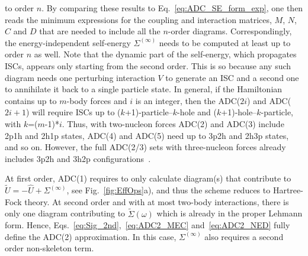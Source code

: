 to order $n$. By comparing these results to Eq.~\eqref{eq:ADC_SE_form_exp}, one then reads
the minimum expressions for the coupling and interaction matrices, $M$, $N$, $C$ and $D$ that are needed to
include all the $n$-order diagrams. Correspondingly, the energy-independent self-energy $\Sigma^{(\infty)}$
needs to be computed at least up to order $n$ as well.
 Note that the dynamic part of the self-energy, which propagates ISCs, appears only starting from the
 second order. This is so because any such diagram needs one perturbing interaction $V$ to generate an ISC
 and a second one to annihilate it back to a single particle state. In general, if the Hamiltonian contains
 up to $m$-body forces and $i$ is an integer, then the ADC($2i$) and ADC($2i+1$) will require
 ISCs up to  ($k$+1)-particle--$k$-hole and ($k$+1)-hole--$k$-particle, with $k$=($m$-1)*$i$.
 Thus, with two-nucleon forces ADC(2) and ADC(3) include  2p1h and 2h1p states,  ADC(4) and ADC(5) need up to 
 3p2h and 2h3p states, and so on. However, the full ADC(2/3) sets with three-nucleon forces already
 includes 3p2h and 3h2p configurations~\cite{ch11_Raimondi_inprep}.

At first order, ADC(1) requires to only calculate diagram(s) that contribute to $\widetilde{U}=-\widehat{U}+\Sigma^{(\infty)}$,
see Fig.~\ref{fig:EffOps}a), and thus the scheme reduces to Hartree-Fock theory.
At second order and with at most two-body interactions, there is only one diagram contributing to $\widetilde\Sigma(\omega)$
which is already in the proper Lehmann form. Hence, Eqs.~\eqref{eq:Sig_2nd},~\eqref{eq:ADC2_MEC} and~\eqref{eq:ADC2_NED}
fully define the ADC(2) approximation. In this case, $\Sigma^{(\infty)}$ also requires a second order non-skeleton term.


